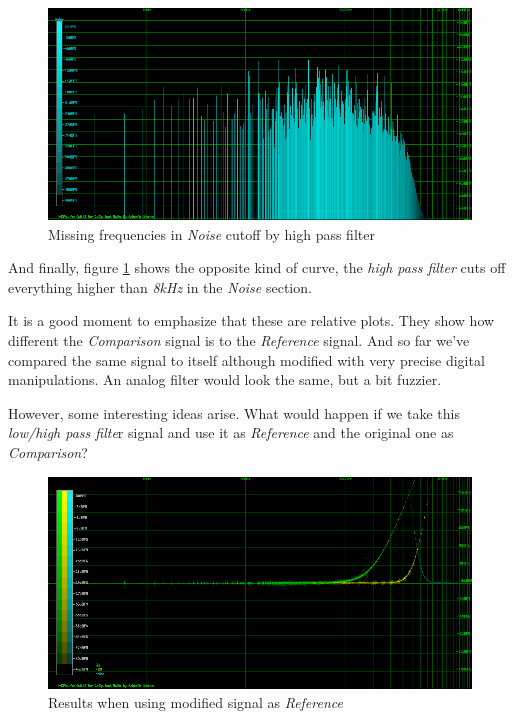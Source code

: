 \documentclass[10pt,a4paper]{report}
\begin{document}
\begin{figure}[H]
	\centering
	\includegraphics[width=1.0\linewidth]{plots/Plot4-6-Missing-Noise.png}
	\caption[Missing Noise]{Missing frequencies in \textit{Noise} cutoff by high pass filter}
	\label{fig:plot4-6-missing-noise}
\end{figure}

And finally, figure \ref{fig:plot4-6-missing-noise} shows the opposite kind of curve, the \textit{high pass filter} cuts off everything higher than \textit{8kHz} in the \textit{Noise} section.

It is a good moment to emphasize that these are relative plots. They show how different the \textit{Comparison} signal is to the \textit{Reference} signal. And so far we've compared the same signal to itself although modified with very precise digital manipulations. An analog filter would look the same, but a bit fuzzier. 

However, some interesting ideas arise. What would happen if we take this \textit{low/high pass filte}r signal and use it as \textit{Reference} and the original one as \textit{Comparison}?

\begin{figure}[H]
	\centering
	\includegraphics[width=1.0\linewidth]{plots/Plot4-7-Reversed.png}
	\caption[Reversed]{Results when using modified signal as \textit{Reference}}
	\label{fig:plot4-7-reversed}
\end{figure}
\end{document}
